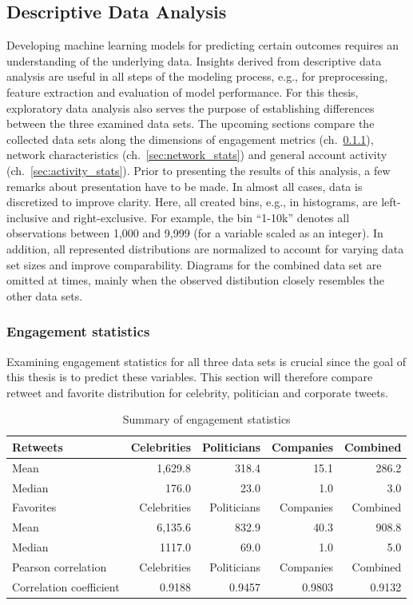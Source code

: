 \subsection{Descriptive Data Analysis}
\label{sec:dda}

Developing machine learning models for predicting certain outcomes requires
an understanding of the underlying data.
Insights derived from descriptive data analysis are useful in all steps of the
modeling process, e.g., for preprocessing, feature extraction and evaluation
of model performance.
For this thesis, exploratory data analysis also serves the purpose of establishing
differences between the three examined data sets.
The upcoming sections compare the collected data sets along the dimensions of
engagement metrics (ch.~\ref{sec:engagement_stats}), network characteristics
(ch.~\ref{sec:network_stats}) and general account activity (ch.~\ref{sec:activity_stats}).
Prior to presenting the results of this analysis, a few remarks about presentation
have to be made.
In almost all cases, data is discretized to improve clarity.
Here, all created bins, e.g., in histograms, are left-inclusive and right-exclusive.
For example, the bin ``1-10k'' denotes all observations between 1,000 and
9,999 (for a variable scaled as an integer).
In addition, all represented distributions are normalized to account for varying
data set sizes and improve comparability.
Diagrams for the combined data set are omitted at times, mainly when the observed
distibution closely resembles the other data sets.

\subsubsection{Engagement statistics}
\label{sec:engagement_stats}

Examining engagement statistics for all three data sets is crucial since the goal
of this thesis is to predict these variables.
This section will therefore compare retweet and favorite distribution for 
celebrity, politician and corporate tweets.

\begin{table}[h]
\begin{tabular}{lrrrr}
\toprule
  Retweets & Celebrities & Politicians & Companies & Combined\\
\midrule
  Mean & 1,629.8 & 318.4 & 15.1 & 286.2\\
  Median & 176.0 & 23.0 & 1.0 & 3.0 \\
\midrule
  Favorites & Celebrities & Politicians & Companies & Combined\\
\midrule
  Mean & 6,135.6 & 832.9 & 40.3 & 908.8 \\
  Median & 1117.0 & 69.0 & 1.0 & 5.0 \\
\midrule
  Pearson correlation & Celebrities & Politicians & Companies & Combined\\
\midrule
  Correlation coefficient & 0.9188 & 0.9457 & 0.9803 & 0.9132\\
\bottomrule
\end{tabular}
\caption{Summary of engagement statistics}
\label{tab:engagement_summary}
\end{table}


